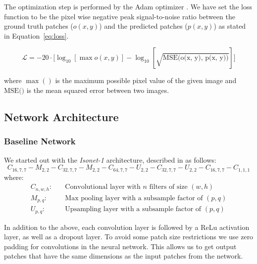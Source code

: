 \documentclass[a4paper, 12pt]{article} %
\begin{document}
The optimization step is performed by the Adam optimizer \citep{kingma2014adam}. We have set the loss function to be the pixel wise negative peak signal-to-noise ratio between the ground truth patches ($o(x, y)$) and the predicted patches ($p(x, y)$) as stated in Equation~\ref{eq:loss}.

\begin{equation}\label{eq:loss}
    \mathcal{L} = -20 \cdot \big[ \log_{10}[\max o(x, y)] - \log_{10}[\sqrt{\text{MSE(o(x, y), p(x, y))}}] \big]
\end{equation}

where $\max()$ is the maximum possible pixel value of the given image and $\text{MSE()}$ is the mean squared error between two images.

\subsection{Network Architecture}
\subsubsection{Baseline Network}\label{sec:baseline}
We started out with the \textit{Isonet-1} architecture, described in \citet{WEIGERT2017} as follows:
\begin{equation}\label{eq:base-model}
    C_{16, 7, 7} - M_{2, 2} - C_{32, 7, 7} - M_{2, 2} - C_{64, 7, 7} - U_{2, 2} - C_{32, 7, 7} - U_{2, 2} - C_{16, 7, 7} - C_{1, 1, 1}
\end{equation}
where:
\begin{align}\label{network-params}
    C_{n, w, h}:\quad &\text{Convolutional layer with $n$ filters of size $(w, h)$}\\
    M_{p, q}:\quad &\text{Max pooling layer with a subsample factor of $(p, q)$}\\
    U_{p, q}:\quad &\text{Upsampling layer with a subsample factor of $(p, q)$}
\end{align}

In addition to the above, each convolution layer is followed by a ReLu activation layer, as well as a dropout layer. To avoid some patch size restrictions we use zero padding for convolutions in the neural network. This allows us to get output patches that have the same dimensions as the input patches from the network.
\end{document}
